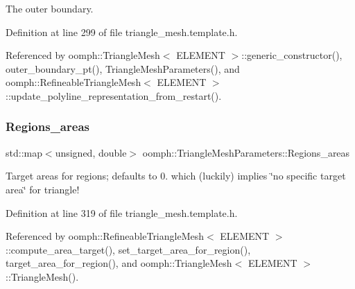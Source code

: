 The outer boundary. 



Definition at line 299 of file triangle\+\_\+mesh.\+template.\+h.



Referenced by oomph\+::\+Triangle\+Mesh$<$ E\+L\+E\+M\+E\+N\+T $>$\+::generic\+\_\+constructor(), outer\+\_\+boundary\+\_\+pt(), Triangle\+Mesh\+Parameters(), and oomph\+::\+Refineable\+Triangle\+Mesh$<$ E\+L\+E\+M\+E\+N\+T $>$\+::update\+\_\+polyline\+\_\+representation\+\_\+from\+\_\+restart().

\mbox{\label{classoomph_1_1TriangleMeshParameters_acab056faae14c8124fed117bd24db277}} 
\subsubsection{\texorpdfstring{Regions\+\_\+areas}{Regions\_areas}}
{\footnotesize\ttfamily std\+::map$<$unsigned, double$>$ oomph\+::\+Triangle\+Mesh\+Parameters\+::\+Regions\+\_\+areas\hspace{0.3cm}{\ttfamily [protected]}}



Target areas for regions; defaults to 0. which (luckily) implies \char`\"{}no specific target area\char`\"{} for triangle! 



Definition at line 319 of file triangle\+\_\+mesh.\+template.\+h.



Referenced by oomph\+::\+Refineable\+Triangle\+Mesh$<$ E\+L\+E\+M\+E\+N\+T $>$\+::compute\+\_\+area\+\_\+target(), set\+\_\+target\+\_\+area\+\_\+for\+\_\+region(), target\+\_\+area\+\_\+for\+\_\+region(), and oomph\+::\+Triangle\+Mesh$<$ E\+L\+E\+M\+E\+N\+T $>$\+::\+Triangle\+Mesh().

\mbox{\label{classoomph_1_1TriangleMeshParameters_a6c1715f0b7b47ec999766afde7e85d91}} 
